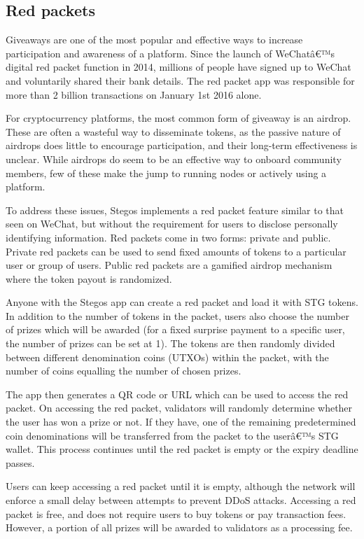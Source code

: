 \documentclass[8pt,fleqn,openany]{book}
\begin{document}
	\subsection{Red packets}\label{sec:red-packets}
	Giveaways are one of the most popular and effective ways to increase participation and awareness of a platform. Since the launch of WeChatâ€™s digital red packet function in 2014, millions of people have signed up to WeChat and voluntarily shared their bank details. The red packet app was responsible for more than 2 billion transactions on January 1st 2016 alone.
	
	For cryptocurrency platforms, the most common form of giveaway is an airdrop. These are often a wasteful way to disseminate tokens, as the passive nature of airdrops does little to encourage participation, and their long-term effectiveness is unclear. While airdrops do seem to be an effective way to onboard community members, few of these make the jump to running nodes or actively using a platform.
	
	To address these issues, Stegos implements a red packet feature similar to that seen on WeChat, but without the requirement for users to disclose personally identifying information. Red packets come in two forms: private and public. Private red packets can be used to send fixed amounts of tokens to a particular user or group of users. Public red packets are a gamified airdrop mechanism where the token payout is randomized.
	
	Anyone with the Stegos app can create a red packet and load it with STG tokens. In addition to the number of tokens in the packet, users also choose the number of prizes which will be awarded (for a fixed surprise payment to a specific user, the number of prizes can be set at 1). The tokens are then randomly divided between different denomination coins (UTXOs) within the packet, with the number of coins equalling the number of chosen prizes. 
	
	The app then generates a QR code or URL which can be used to access the red packet. On accessing the red packet, validators will randomly determine whether the user has won a prize or not. If they have, one of the remaining predetermined coin denominations will be transferred from the packet to the userâ€™s STG wallet. This process continues until the red packet is empty or the expiry deadline passes.
	
	Users can keep accessing a red packet until it is empty, although the network will enforce a small delay between attempts to prevent DDoS attacks. Accessing a red packet is free, and does not require users to buy tokens or pay transaction fees. However, a portion of all prizes will be awarded to validators as a processing fee.
	
\end{document}
